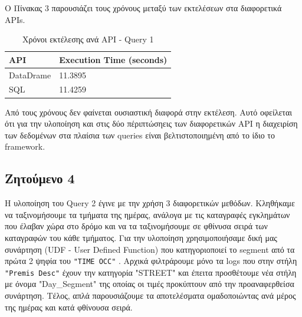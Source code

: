 \documentclass{article}
\begin{document}
Ο Πίνακας 3 παρουσιάζει τους χρόνους μεταξύ των εκτελέσεων στα διαφορετικά  APIs. 
\begin{table}[h]
\centering
\begin{tabular}{|l|l|}
\hline
\textbf{API}    & \textbf{Execution Time (seconds)} \\ \hline
DataDrame       & 11.3895                           \\ \hline
SQL             & 11.4259                           \\ \hline
\end{tabular}
\caption{ Χρόνοι εκτέλεσης ανά API - Query 1}
\label{table:execution_times}
\end{table}

Από τους χρόνους δεν φαίνεται ουσιαστική διαφορά στην εκτέλεση. Αυτό οφείλεται ότι για την υλοποίηση και στις δύο πέριπτώσηεις των διαφορετικών  API  η διαχειρίση των δεδομένων στα πλαίσια των queries είναι βελτιστοποιημένη από το ίδιο το framework.


\subsection*{Ζητούμενο 4}
\label{subsec:Z4}

Η υλοποίηση του  Query 2  έγινε με την χρήση 3 διαφορετικών μεθόδων. Κληθήκαμε να ταξινομήσουμε τα τμήματα της ημέρας, ανάλογα με τις καταγραφές εγκλημάτων που έλαβαν χώρα στο δρόμο και να τα ταξινομήσουμε σε φθίνυσα σειρά των καταγραφών του κάθε τμήματος. Για την υλοποίηση χρησιμοποιήσαμε δική μας συνάρτηση (UDF - User Defined Function)  που κατηγοριοποιεί το 
segment  από τα πρώτα 2 ψηφία του  \texttt{"TIME OCC"} . Αρχικά φιλτράρουμε μόνο τα  logs  που στην στήλη  \texttt{"Premis Desc"}  έχουν την κατηγορία "STREET" και έπειτα προσθέτουμε νέα στήλη με όνομα "Day\_Segment"  της οποίας οι τιμές προκύπτουν από την προαναφερθείσα συνάρτηση. Τέλος, απλά παρουσιάζουμε τα αποτελέσματα ομαδοποιώντας ανά μέρος της ημέρας και κατά φθίνουσα σειρά.\\
\end{document}
